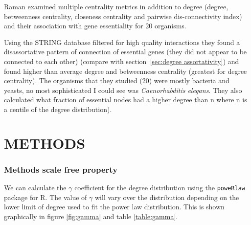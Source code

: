 Raman \cite{raman2014organisational} examined multiple centrality metrics in addition to degree (degree, betweenness centrality, closeness centrality and pairwise dis-connectivity index) and their association with gene essentiality for 20 organisms.

 Using the STRING database filtered for high quality interactions they found a disassortative  pattern of connection of essential genes (they did not appear to be connected to each other)  (compare with section~\ref{sec:degree assortativity})  and found higher than average degree and betweenness centrality (greatest for degree centrality). The organisms that they studied (20) were mostly bacteria and yeasts, no most sophisticated I could see was \textit{Caenorhabditis elegans}. They also calculated what fraction of essential nodes had a higher degree than n where n is a centile of the degree distribution).








\section{METHODS}

\subsubsection{Methods scale free property}
We can calculate the $\gamma$ coefficient for the degree distribution using the \texttt{poweRlaw} package for R. The value of $\gamma$ will vary over the distribution depending on the lower limit of degree used to fit the power law distribution. This is shown graphically in figure \ref{fig:gamma} and table \ref{table:gamma}.


